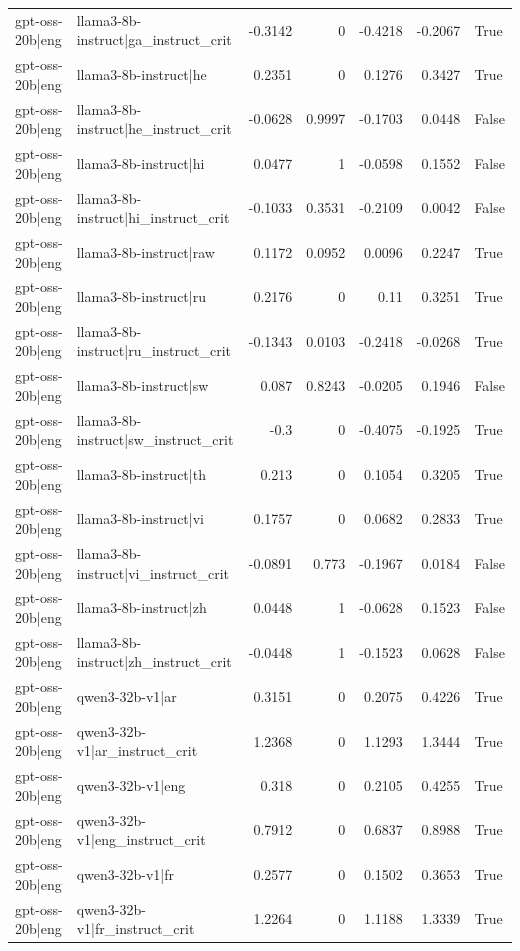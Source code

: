 \begin{table}
\begin{tabular}{l l r r r r l}
gpt-oss-20b|eng & llama3-8b-instruct|ga_instruct_crit & -0.3142 & 0 & -0.4218 & -0.2067 & True \\
gpt-oss-20b|eng & llama3-8b-instruct|he & 0.2351 & 0 & 0.1276 & 0.3427 & True \\
gpt-oss-20b|eng & llama3-8b-instruct|he_instruct_crit & -0.0628 & 0.9997 & -0.1703 & 0.0448 & False \\
gpt-oss-20b|eng & llama3-8b-instruct|hi & 0.0477 & 1 & -0.0598 & 0.1552 & False \\
gpt-oss-20b|eng & llama3-8b-instruct|hi_instruct_crit & -0.1033 & 0.3531 & -0.2109 & 0.0042 & False \\
gpt-oss-20b|eng & llama3-8b-instruct|raw & 0.1172 & 0.0952 & 0.0096 & 0.2247 & True \\
gpt-oss-20b|eng & llama3-8b-instruct|ru & 0.2176 & 0 & 0.11 & 0.3251 & True \\
gpt-oss-20b|eng & llama3-8b-instruct|ru_instruct_crit & -0.1343 & 0.0103 & -0.2418 & -0.0268 & True \\
gpt-oss-20b|eng & llama3-8b-instruct|sw & 0.087 & 0.8243 & -0.0205 & 0.1946 & False \\
gpt-oss-20b|eng & llama3-8b-instruct|sw_instruct_crit & -0.3 & 0 & -0.4075 & -0.1925 & True \\
gpt-oss-20b|eng & llama3-8b-instruct|th & 0.213 & 0 & 0.1054 & 0.3205 & True \\
gpt-oss-20b|eng & llama3-8b-instruct|vi & 0.1757 & 0 & 0.0682 & 0.2833 & True \\
gpt-oss-20b|eng & llama3-8b-instruct|vi_instruct_crit & -0.0891 & 0.773 & -0.1967 & 0.0184 & False \\
gpt-oss-20b|eng & llama3-8b-instruct|zh & 0.0448 & 1 & -0.0628 & 0.1523 & False \\
gpt-oss-20b|eng & llama3-8b-instruct|zh_instruct_crit & -0.0448 & 1 & -0.1523 & 0.0628 & False \\
gpt-oss-20b|eng & qwen3-32b-v1|ar & 0.3151 & 0 & 0.2075 & 0.4226 & True \\
gpt-oss-20b|eng & qwen3-32b-v1|ar_instruct_crit & 1.2368 & 0 & 1.1293 & 1.3444 & True \\
gpt-oss-20b|eng & qwen3-32b-v1|eng & 0.318 & 0 & 0.2105 & 0.4255 & True \\
gpt-oss-20b|eng & qwen3-32b-v1|eng_instruct_crit & 0.7912 & 0 & 0.6837 & 0.8988 & True \\
gpt-oss-20b|eng & qwen3-32b-v1|fr & 0.2577 & 0 & 0.1502 & 0.3653 & True \\
gpt-oss-20b|eng & qwen3-32b-v1|fr_instruct_crit & 1.2264 & 0 & 1.1188 & 1.3339 & True \\

\end{tabular}
\end{table}
